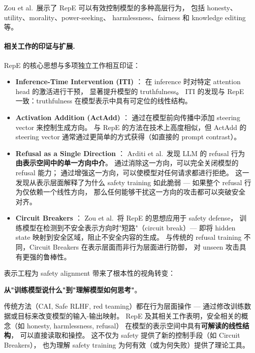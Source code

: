 Zou et al.\ 展示了 RepE 可以有效控制模型的多种高层行为，
包括 honesty、utility、morality、power-seeking、
harmlessness、fairness 和 knowledge editing 等。

\paragraph{相关工作的印证与扩展.}
RepE 的核心思想与多项独立工作相互印证：

\begin{itemize}[leftmargin=2em]
  \item \textbf{Inference-Time Intervention (ITI)} \cite{li2023iti}：
    在 inference 时对特定 attention head 的激活进行干预，
    显著提升模型的 truthfulness。
    ITI 的发现与 RepE 一致：truthfulness 在模型表示中具有可定位的线性结构。

  \item \textbf{Activation Addition (ActAdd)} \cite{turner2023actadd}：
    通过在模型前向传播中添加 steering vector 来控制生成方向。
    与 RepE 的方法在技术上高度相似，但 ActAdd 的 steering vector
    通常通过更简单的方式获得（如直接的 prompt contrast）。

  \item \textbf{Refusal as a Single Direction} \cite{arditi2024refusal}：
    Arditi et al.\ 发现 LLM 的 refusal 行为
    \textbf{由表示空间中的单一方向中介}。
    通过消除这一方向，可以完全关闭模型的 refusal 能力；
    通过增强这一方向，可以使模型对任何请求都进行拒绝。
    这一发现从表示层面解释了为什么 safety training 如此脆弱 ---
    如果整个 refusal 行为仅依赖一个线性方向，
    那么任何能够干扰这一方向的攻击都可以突破安全对齐。

  \item \textbf{Circuit Breakers} \cite{zou2024circuitbreakers}：
    Zou et al.\ 将 RepE 的思想应用于 safety defense，
    训练模型在检测到不安全表示方向时"短路"（circuit break）---
    即将 hidden state 映射到安全区域，阻止不安全内容的生成。
    与传统的 refusal training 不同，Circuit Breakers 在表示层面而非行为层面进行防御，
    对 unseen 攻击具有更强的鲁棒性。
\end{itemize}

\begin{solutionbox}
表示工程为 safety alignment 带来了根本性的视角转变：

\textbf{从"训练模型说什么"到"理解模型如何思考"}。

传统方法（CAI, Safe RLHF, red teaming）都在行为层面操作 ---
通过修改训练数据或目标来改变模型的输入-输出映射。
RepE 及其相关工作表明，安全相关的概念（如 honesty, harmlessness, refusal）
在模型的表示空间中具有\textbf{可解读的线性结构}，
可以直接读取和操控。
这不仅为 safety 提供了新的控制手段（如 Circuit Breakers），
也为理解 safety training 为何有效（或为何失败）提供了理论工具。
\end{solutionbox}

